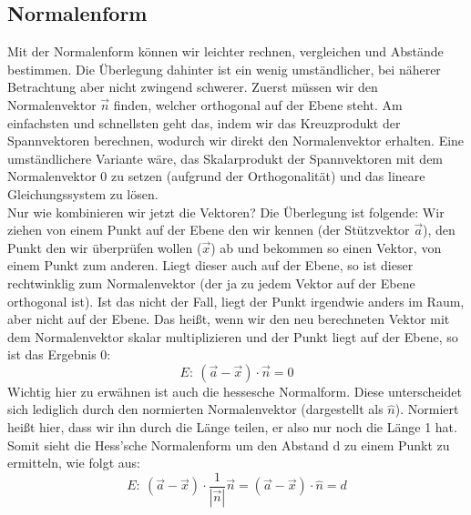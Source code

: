 	\subsection{Normalenform}
		Mit der Normalenform können wir leichter rechnen, vergleichen und Abstände
		bestimmen. Die Überlegung dahinter ist ein wenig umständlicher, bei näherer
		Betrachtung aber nicht zwingend schwerer. Zuerst müssen wir den Normalenvektor
		\(\vec{n}\) finden, welcher orthogonal auf der Ebene steht. Am einfachsten und
		schnellsten geht das, indem wir das Kreuzprodukt der Spannvektoren berechnen,
		wodurch wir direkt den Normalenvektor erhalten. Eine umständlichere Variante
		wäre, das Skalarprodukt der Spannvektoren mit dem Normalenvektor 0 zu setzen
		(aufgrund der Orthogonalität) und das lineare Gleichungssystem zu lösen.\\
		Nur wie kombinieren wir jetzt die Vektoren? Die Überlegung ist folgende: Wir
		ziehen von einem Punkt auf der Ebene den wir kennen (der Stützvektor
		\(\vec{a}\)), den Punkt den wir überprüfen wollen (\(\vec{x}\)) ab und
		bekommen so einen Vektor, von einem Punkt zum anderen. Liegt dieser auch auf
		der Ebene, so ist dieser rechtwinklig zum Normalenvektor (der ja zu jedem
		Vektor auf der Ebene orthogonal ist). Ist das nicht der Fall, liegt der Punkt
		irgendwie anders im Raum, aber nicht auf der Ebene. Das heißt, wenn wir den
		neu berechneten Vektor mit dem Normalenvektor skalar multiplizieren und der
		Punkt liegt auf der Ebene, so ist das Ergebnis 0:
		\[E:\ (\vec{a}-\vec{x})\cdot\vec{n}=0\]
		Wichtig hier zu erwähnen ist auch die hessesche Normalform. Diese
		unterscheidet sich lediglich durch den normierten Normalenvektor (dargestellt
		als \(\hat n\)). Normiert heißt hier, dass wir ihn durch die Länge teilen, er
		also nur noch die Länge 1 hat. Somit sieht die Hess'sche Normalenform um den
		Abstand d zu einem Punkt zu ermitteln, wie folgt aus:
		\[E:\ (\vec{a}-\vec{x})\cdot \frac{1}{|\vec{n}|}\vec{n}=(\vec{a}-\vec{x})\cdot
		\hat{n}=d\]

